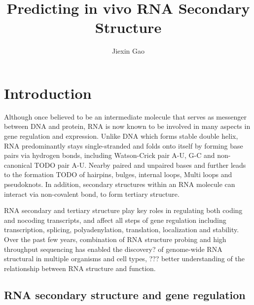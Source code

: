 \documentclass{proposal}
\author{Jiexin Gao}
\title{Predicting in vivo RNA Secondary Structure}
\begin{document}
\begin{preliminary}

\maketitle

\begin{abstract}



\end{abstract}

\tableofcontents

\end{preliminary}





\chapter{Introduction}




Although once believed to be an intermediate molecule that serves as messenger between DNA and protein,
RNA is now known to be involved in many aspects in gene regulation and expression.
Unlike DNA which forms stable double helix, RNA predominantly stays single-stranded and folds onto itself by
forming base pairs via hydrogen bonds, including Watson-Crick pair A-U, G-C and non-canonical TODO pair A-U.
Nearby paired and unpaired bases  and further leads to the formation TODO of
hairpins, bulges, internal loops, Multi loops and pseudoknots.
In addition, secondary structures within an RNA molecule can interact via non-covalent bond, to form tertiary structure.


RNA secondary and tertiary structure play key roles in regulating both coding and nocoding transcripts,
and affect all steps of gene regulation including transcription, splicing, polyadenylation, translation,
localization and stability\cite{wan2011understanding}.
Over the past few years, combination of RNA structure probing and high throughput sequencing has enabled
the discovery? of genome-wide RNA structural in multiple organisms and cell types,
??? better understanding of the relationship between RNA structure and function.


\section{RNA secondary structure and gene regulation}
\end{document}
